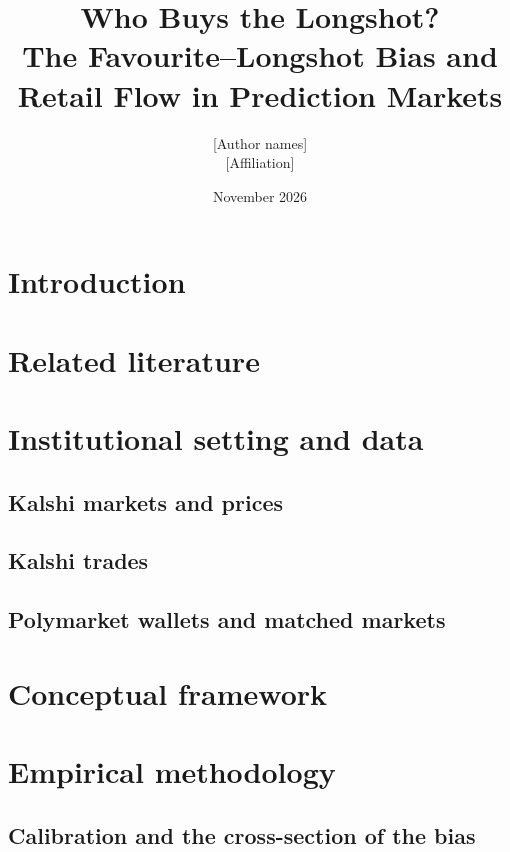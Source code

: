 \documentclass[11pt]{article}
\title{Who Buys the Longshot?\\[4pt] The Favourite--Longshot Bias and Retail Flow in Prediction Markets}
\author{[Author names]\\[2pt]\small [Affiliation]}
\date{November 2026}
\theoremstyle{definition}
\theoremstyle{remark}
\begin{document}
\maketitle
\begin{abstract}

\end{abstract}

\section{Introduction}\label{sec:intro}


\section{Related literature}\label{sec:lit}


\section{Institutional setting and data}\label{sec:data}

\subsection{Kalshi markets and prices}\label{sec:data-xs}

\subsection{Kalshi trades}\label{sec:data-flow}

\subsection{Polymarket wallets and matched markets}\label{sec:data-wallets}


\section{Conceptual framework}\label{sec:framework}


\section{Empirical methodology}\label{sec:method}

\subsection{Calibration and the cross-section of the bias}\label{sec:method-xs}

\end{document}
